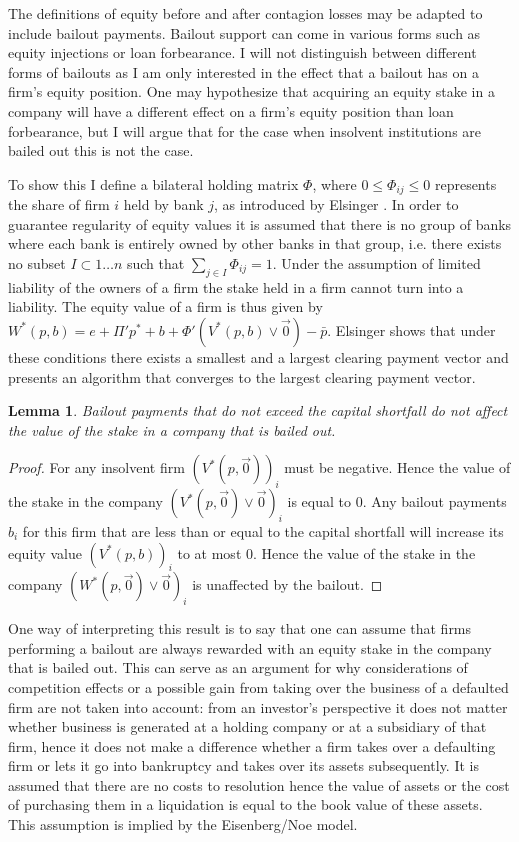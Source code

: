 \documentclass[12pt,a4paper]{article}
\newtheorem{lemma}{Lemma}
\begin{document}
The definitions of equity before and after contagion losses may be adapted to include bailout payments. Bailout support can come in various forms such as equity injections or loan forbearance. I will not distinguish between different forms of bailouts as I am only interested in the effect that a bailout has on a firm’s equity position. One may hypothesize that acquiring an equity stake in a company will have a different effect on a firm’s equity position than loan forbearance, but I will argue that for the case when insolvent institutions are bailed out this is not the case.

To show this I define a bilateral holding matrix $\Phi$, where $0\le \Phi_{ij}\le 0$ represents the share of firm $i$ held by bank $j$, as introduced by Elsinger \cite{Els09}. In order to guarantee regularity of equity values it is assumed that there is no group of banks where each bank is entirely owned by other banks in that group, i.e. there exists no subset $I\subset{1\dots n}$ such that $\sum_{j\in I} \Phi_{ij} =1$. Under the assumption of limited liability of the owners of a firm the stake held in a firm cannot turn into a liability. The equity value of a firm is thus given by $W^* (p,b)=e+\Pi'p^*+b+\Phi'(V^* (p,b)\vee \vec{0})-\bar{p}$. Elsinger \cite{Els09} shows that under these conditions there exists a smallest and a largest clearing payment vector and presents an algorithm that converges to the largest clearing payment vector.

\begin{lemma} \label{lem:freebailout}
Bailout payments that do not exceed the capital shortfall do not affect the value of the stake in a company that is bailed out.
\end{lemma}

\begin{proof}
For any insolvent firm $(V^* (p,\vec{0}))_i$ must be negative. Hence the value of the stake in the company $(V^* (p,\vec{0})\vee \vec{0})_i$ is equal to $0$. Any bailout payments $b_i$ for this firm that are less than or equal to the capital shortfall will increase its equity value $(V^* (p,b))_i$ to at most $0$. Hence the value of the stake in the company $(W^* (p,\vec{0}) \vee \vec{0})_i$ is unaffected by the bailout.
\end{proof}

One way of interpreting this result is to say that one can assume that firms performing a bailout are always rewarded with an equity stake in the company that is bailed out. This can serve as an argument for why considerations of competition effects or a possible gain from taking over the business of a defaulted firm are not taken into account: from an investor's perspective it does not matter whether business is generated at a holding company or at a subsidiary of that firm, hence it does not make a difference whether a firm takes over a defaulting firm or lets it go into bankruptcy and takes over its assets subsequently. It is assumed that there are no costs to resolution hence the value of assets or the cost of purchasing them in a liquidation is equal to the book value of these assets. This assumption is implied by the Eisenberg/Noe \cite{Eis01} model. 
\end{document}
